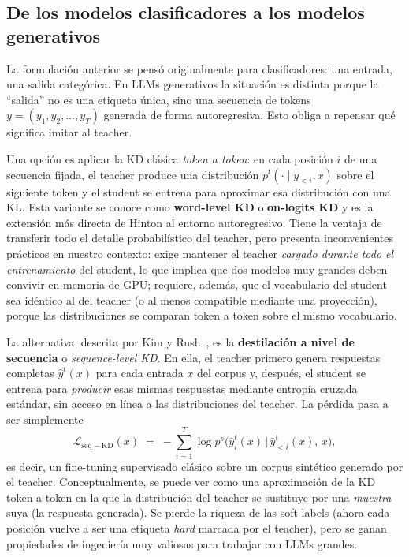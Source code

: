 \subsection{De los modelos clasificadores a los modelos generativos}

La formulación anterior se pensó originalmente para clasificadores: una entrada, una salida categórica. En LLMs generativos la situación es distinta porque la ``salida'' no es una etiqueta única, sino una secuencia de tokens $y = (y_1, y_2, \dots, y_T)$ generada de forma autoregresiva. Esto obliga a repensar qué significa imitar al teacher.

Una opción es aplicar la KD clásica \emph{token a token}: en cada posición $i$ de una secuencia fijada, el teacher produce una distribución $p^t(\cdot \mid y_{<i}, x)$ sobre el siguiente token y el student se entrena para aproximar esa distribución con una KL. Esta variante se conoce como \textbf{word-level KD} o \textbf{on-logits KD} y es la extensión más directa de Hinton al entorno autoregresivo. Tiene la ventaja de transferir todo el detalle probabilístico del teacher, pero presenta inconvenientes prácticos en nuestro contexto: exige mantener el teacher \emph{cargado durante todo el entrenamiento} del student, lo que implica que dos modelos muy grandes deben convivir en memoria de GPU; requiere, además, que el vocabulario del student sea idéntico al del teacher (o al menos compatible mediante una proyección), porque las distribuciones se comparan token a token sobre el mismo vocabulario.

La alternativa, descrita por Kim y Rush~\cite{kim2016sequence}, es la \textbf{destilación a nivel de secuencia} o \textit{sequence-level KD}. En ella, el teacher primero genera respuestas completas $\hat{y}^t(x)$ para cada entrada $x$ del corpus y, después, el student se entrena para \emph{producir} esas mismas respuestas mediante entropía cruzada estándar, sin acceso en línea a las distribuciones del teacher. La pérdida pasa a ser simplemente
\[
\mathcal{L}_{\mathrm{seq-KD}}(x) \;=\; -\sum_{i=1}^{T} \log p^s\!\big(\hat{y}^t_i(x)\,\big|\,\hat{y}^t_{<i}(x),\, x\big),
\]
es decir, un fine-tuning supervisado clásico sobre un corpus sintético generado por el teacher. Conceptualmente, se puede ver como una aproximación de la KD token a token en la que la distribución del teacher se sustituye por una \emph{muestra} suya (la respuesta generada). Se pierde la riqueza de las soft labels (ahora cada posición vuelve a ser una etiqueta \emph{hard} marcada por el teacher), pero se ganan propiedades de ingeniería muy valiosas para trabajar con LLMs grandes.

